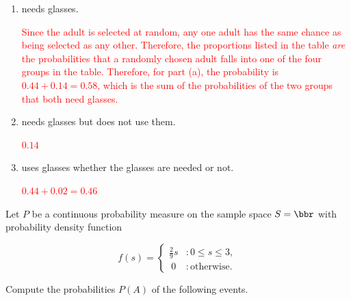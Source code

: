 \documentclass[12pt,reqno]{amsart}
\begin{document}
\medskip
\begin{enumerate}
    \item needs glasses.
    
    \bigskip
    \textcolor{red}{Since the adult is selected at random, any one adult has the same chance as being selected as any other. Therefore, the proportions listed in the table \textit{are} the probabilities that a randomly chosen adult falls into one of the four groups in the table. Therefore, for part (a), the probability is $0.44 + 0.14 = 0.58$, which is the sum of the probabilities of the two groups that both need glasses.}
    \bigskip

    \item needs glasses but does not use them.
    
    \bigskip
    \textcolor{red}{$0.14$}
    \bigskip

    \item uses glasses whether the glasses are needed or not.
    
    \bigskip
    \textcolor{red}{$0.44+0.02=0.46$}
    \bigskip
\end{enumerate}














\bigskip
\prob Let $P$ be a continuous probability measure on the sample space $S=\bbr$ with probability density function

    \[f(s) = \begin{cases}
    \frac{2}{9}s & : 0 \leq s \leq 3, \\\
    0 & : \text{otherwise}.    
    \end{cases}\]

Compute the probabilities $P(A)$ of the following events.
\end{document}

